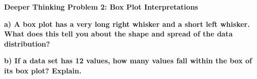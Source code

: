 \documentclass[12pt, letterpaper, fleqn]{article}
\begin{document}
\begin{tcolorbox}[colback=yellow!15, colframe=orange, boxrule=1.5pt, arc=4mm, left=6mm, right=6mm, top=5mm, bottom=5mm]
\textbf{Deeper Thinking Problem 2: Box Plot Interpretations}

\medskip

\noindent
\textbf{a) A box plot has a very long right whisker and a short left whisker. What does this tell you about the shape and spread of the data distribution?}

\vspace{2cm}

\noindent
\textbf{b) If a data set has 12 values, how many values fall within the box of its box plot? Explain.}

\vspace{2cm}
\end{tcolorbox}
\newpage
\end{document}
